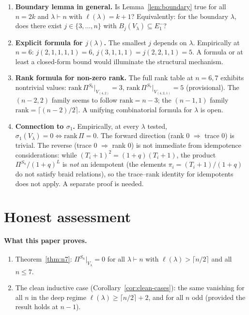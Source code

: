 \documentclass[11pt]{article}
\theoremstyle{definition}
\begin{document}
\begin{enumerate}[leftmargin=2em,topsep=0.3em,itemsep=0.2em]

\item \textbf{Boundary lemma in general.} Is Lemma~\ref{lem:boundary}
true for all $n=2k$ and $\lambda\vdash n$ with $\ell(\lambda)=k+1$?
Equivalently: for the boundary $\lambda$, does there exist
$j\in\{3,\ldots,n\}$ with $B_j(V_\lambda)\subseteq E_1^-$?

\item \textbf{Explicit formula for $j(\lambda)$.} The smallest
$j$ depends on $\lambda$. Empirically at $n=6$:
$j(2,1,1,1,1)=6$, $j(3,1,1,1)=j(2,2,1,1)=5$. A formula or at least
a closed-form bound would illuminate the structural mechanism.

\item \textbf{Rank formula for non-zero rank.} The full rank table
at $n=6,7$ exhibits nontrivial values:
$\mathrm{rank}\,\Pi^{S_6}|_{V_{(4,2)}}=3$, $\mathrm{rank}\,\Pi^{S_7}|_{V_{(4,2,1)}}=5$
(provisional). The $(n-2,2)$ family seems to follow
$\mathrm{rank}=n-3$; the $(n-1,1)$ family
$\mathrm{rank}=\lceil(n-2)/2\rceil$. A unifying combinatorial
formula for $\lambda$ is open.

\item \textbf{Connection to $\sigma_1$.} Empirically, at every
$\lambda$ tested, $\sigma_1(V_\lambda) = 0 \iff \mathrm{rank}\,\Pi=0$.
The forward direction (rank $0$ $\Rightarrow$ trace $0$) is
trivial. The reverse (trace $0$ $\Rightarrow$ rank $0$) is not
immediate from idempotence considerations: while $(T_i+1)^2=(1+q)(T_i+1)$,
the product $\Pi^{S_n}/(1+q)^L$ is \emph{not} an idempotent
(the elements $\pi_i = (T_i+1)/(1+q)$ do not satisfy braid
relations), so the trace--rank identity for idempotents does
not apply. A separate proof is needed.

\end{enumerate}

\section{Honest assessment}\label{sec:honest}

\paragraph{What this paper proves.}
\begin{enumerate}[leftmargin=2em,topsep=0.3em,itemsep=0.2em]
\item Theorem~\ref{thm:n7}: $\Pi^{S_n}|_{V_\lambda}=0$ for all
$\lambda\vdash n$ with $\ell(\lambda)>\lceil n/2\rceil$ and all
$n\le 7$.
\item The clean inductive case (Corollary~\ref{cor:clean-cases}):
the same vanishing for all $n$ in the deep regime
$\ell(\lambda)\ge\lceil n/2\rceil+2$, and for all $n$ odd
(provided the result holds at $n-1$).
\end{enumerate}
\end{document}
